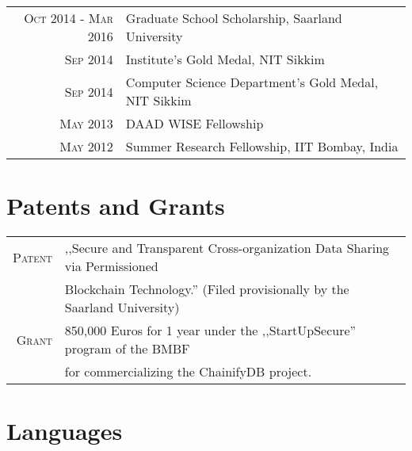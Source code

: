 \documentclass[a4paper,10pt]{article} %
\begin{document}
\begin{tabular}{rl}
\textsc{Oct 2014 - Mar 2016} & Graduate School Scholarship, Saarland University\\
\textsc{Sep 2014} & Institute's Gold Medal, NIT Sikkim\\
\textsc{Sep 2014} & Computer Science Department's Gold Medal, NIT Sikkim\\
\textsc{May} 2013 & DAAD WISE Fellowship\\
\textsc{May} 2012 & Summer Research Fellowship, IIT Bombay, India\\
\end{tabular}


\section{Patents and Grants}

\begin{tabular}{rl}
\textsc{Patent} & ,,Secure and Transparent Cross-organization Data Sharing via Permissioned\\
&Blockchain Technology.'' (Filed provisionally by the Saarland University)\\
\textsc{Grant} & 850,000 Euros for 1 year under the ,,StartUpSecure'' program of the BMBF\\
& for commercializing the ChainifyDB project.
\end{tabular}

\renewcommand\refname{Publications}
\setlength\bibitemsep{\baselineskip}


\nocite{*}


\section{Languages}
\end{document}

